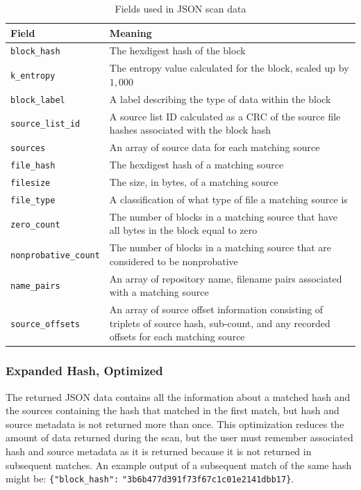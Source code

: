 \documentclass[11pt,fleqn]{article} %
\begin{document}
\begin{table}[!ht]

\centering
\caption{Fields used in JSON scan data}
\label{tab:JSONScanDataExpanded}
\begin{tabular}{|p{5 cm}|p{8.8 cm}|}
\hline \hline
\textbf{Field} & \textbf{Meaning} \\
\hline
\verb+block_hash+ & The hexdigest hash of the block\\
\hline
\verb+k_entropy+ & The entropy value calculated for the block, scaled up by $1,000$\\
\hline
\verb+block_label+ & A label describing the type of data within the block\\
\hline
\verb+source_list_id+ & A source list ID calculated as a CRC of the source file hashes associated with the block hash\\
\hline
\verb+sources+ & An array of source data for each matching source\\
\hline
\verb+file_hash+ & The hexdigest hash of a matching source\\
\hline
\verb+filesize+ & The size, in bytes, of a matching source\\
\hline
\verb+file_type+ & A classification of what type of file a matching source is\\
\hline
\verb+zero_count+ & The number of blocks in a matching source that have all bytes in the block equal to zero\\
\hline
\verb+nonprobative_count+ & The number of blocks in a matching source that are considered to be nonprobative\\
\hline
\verb+name_pairs+ & An array of repository name, filename pairs associated with a matching source\\
\hline
\verb+source_offsets+ & An array of source offset information consisting of triplets of source hash, sub-count, and any recorded offsets for each matching source\\
\hline
\end{tabular}
\end{table}

\subsubsection{Expanded Hash, Optimized}
The returned JSON data contains all the information about a matched hash and the sources containing the hash that matched in the first match, but hash and source metadata is not returned more than once. This optimization reduces the amount of data returned during the scan, but the user must remember associated hash and source metadata as it is returned because it is not returned in subsequent matches. An example output of a subsequent match of the same hash might be: \verb+{"block_hash":+ \verb+"3b6b477d391f73f67c1c01e2141dbb17}+.\\
\end{document}

